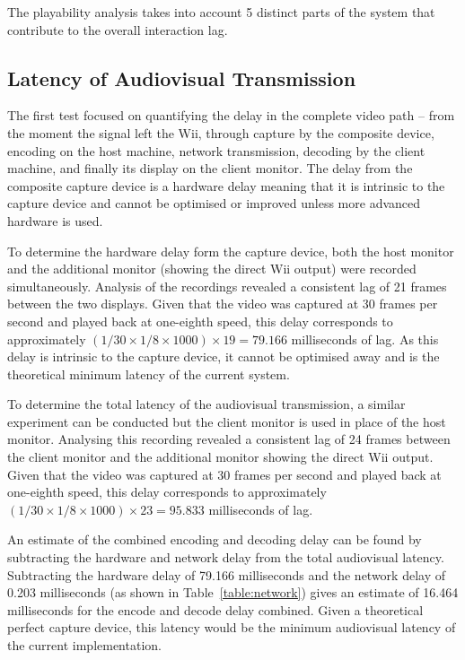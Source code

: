 The playability analysis takes into account 5 distinct parts of the system that
contribute to the overall interaction lag\cite{volkerseekerBestPaper}.

\subsection{Latency of Audiovisual Transmission}
\label{subsec:latency-audiovisual}

The first test focused on quantifying the delay in the complete video path -- from
the moment the signal left the Wii, through capture by the composite device,
encoding on the host machine, network transmission, decoding by the client
machine, and finally its display on the client monitor. The delay from the composite
capture device is a hardware delay meaning that it is intrinsic to the
capture device and cannot be optimised or improved unless more advanced hardware is
used.

To determine the hardware delay form the capture device,
both the host monitor and the additional monitor (showing the direct Wii
output) were recorded simultaneously. Analysis of the recordings revealed a
consistent lag of 21 frames between the two displays. Given that the video was
captured at 30 frames per second and played back at one-eighth speed, this delay
corresponds to approximately $(1/30 \times 1/8 \times 1000) \times 19 = 79.166$ milliseconds of lag. As this delay is intrinsic to the capture device, it cannot be optimised away and is the theoretical minimum latency of the current system.

To determine the total latency of the audiovisual transmission, a similar experiment can be conducted but the client monitor is used in place of the host monitor. Analysing this recording revealed a consistent lag of 24 frames between the client monitor and the additional monitor showing the direct Wii output. Given that the video was captured at 30 frames per second and played back at one-eighth speed, this delay corresponds to approximately $(1/30 \times 1/8 \times 1000) \times 23 = 95.833$ milliseconds of lag.

An estimate of the combined encoding and decoding delay can be found by subtracting the hardware and network delay from the total audiovisual latency. Subtracting the hardware delay of 79.166 milliseconds and the network delay of 0.203 milliseconds (as shown in Table~\ref{table:network}) gives an
estimate of 16.464 milliseconds for the encode and decode delay combined. Given a theoretical perfect capture
device, this latency would be the minimum audiovisual latency of the current implementation.

